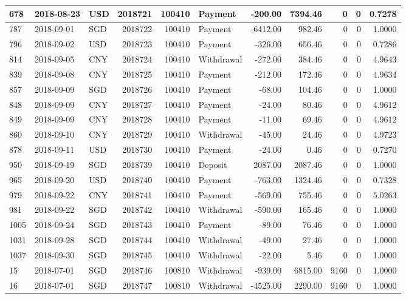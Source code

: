 \documentclass[]{article}
\begin{document}
\begin{table}[H]
\begin{tabular}{l|l|l|r|r|l|r|r|r|r|r}
\hline
678 & 2018-08-23 & USD & 2018721 & 100410 & Payment & -200.00 & 7394.46 & 0 & 0 & 0.7278\\
\hline
787 & 2018-09-01 & SGD & 2018722 & 100410 & Payment & -6412.00 & 982.46 & 0 & 0 & 1.0000\\
\hline
796 & 2018-09-02 & USD & 2018723 & 100410 & Payment & -326.00 & 656.46 & 0 & 0 & 0.7286\\
\hline
814 & 2018-09-05 & CNY & 2018724 & 100410 & Withdrawal & -272.00 & 384.46 & 0 & 0 & 4.9643\\
\hline
839 & 2018-09-08 & CNY & 2018725 & 100410 & Payment & -212.00 & 172.46 & 0 & 0 & 4.9634\\
\hline
857 & 2018-09-09 & SGD & 2018726 & 100410 & Payment & -68.00 & 104.46 & 0 & 0 & 1.0000\\
\hline
848 & 2018-09-09 & CNY & 2018727 & 100410 & Payment & -24.00 & 80.46 & 0 & 0 & 4.9612\\
\hline
849 & 2018-09-09 & CNY & 2018728 & 100410 & Payment & -11.00 & 69.46 & 0 & 0 & 4.9612\\
\hline
860 & 2018-09-10 & CNY & 2018729 & 100410 & Withdrawal & -45.00 & 24.46 & 0 & 0 & 4.9723\\
\hline
878 & 2018-09-11 & USD & 2018730 & 100410 & Payment & -24.00 & 0.46 & 0 & 0 & 0.7270\\
\hline
950 & 2018-09-19 & SGD & 2018739 & 100410 & Deposit & 2087.00 & 2087.46 & 0 & 0 & 1.0000\\
\hline
965 & 2018-09-20 & USD & 2018740 & 100410 & Payment & -763.00 & 1324.46 & 0 & 0 & 0.7328\\
\hline
979 & 2018-09-22 & CNY & 2018741 & 100410 & Payment & -569.00 & 755.46 & 0 & 0 & 5.0263\\
\hline
981 & 2018-09-22 & SGD & 2018742 & 100410 & Withdrawal & -590.00 & 165.46 & 0 & 0 & 1.0000\\
\hline
1005 & 2018-09-24 & SGD & 2018743 & 100410 & Payment & -89.00 & 76.46 & 0 & 0 & 1.0000\\
\hline
1031 & 2018-09-28 & SGD & 2018744 & 100410 & Withdrawal & -49.00 & 27.46 & 0 & 0 & 1.0000\\
\hline
1037 & 2018-09-30 & SGD & 2018745 & 100410 & Withdrawal & -22.00 & 5.46 & 0 & 0 & 1.0000\\
\hline
15 & 2018-07-01 & SGD & 2018746 & 100810 & Withdrawal & -939.00 & 6815.00 & 9160 & 0 & 1.0000\\
\hline
16 & 2018-07-01 & SGD & 2018747 & 100810 & Withdrawal & -4525.00 & 2290.00 & 9160 & 0 & 1.0000\\

\end{tabular}
\end{table}
\end{document}
